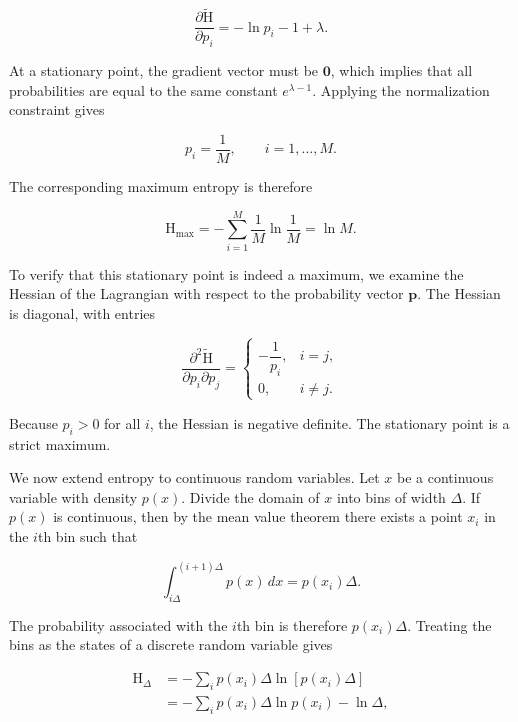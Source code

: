 \documentclass[10pt,twocolumn]{memoir}
\begin{document}
\begin{equation}
    \frac{\partial \widetilde{\mathrm{H}}}{\partial p_i} = -\ln p_i - 1 + \lambda.
\end{equation}

At a stationary point, the gradient vector must be $\mathbf{0}$, which implies that all probabilities are equal to the same constant $e^{\lambda-1}$. Applying the normalization constraint gives

\begin{equation}
    p_i = \frac{1}{M}, \qquad i=1,\ldots,M.
\end{equation}

The corresponding maximum entropy is therefore

\begin{equation}
    \mathrm{H}_{\max} = -\sum_{i=1}^{M}\frac{1}{M}\ln\frac{1}{M} = \ln M.
\end{equation}

To verify that this stationary point is indeed a maximum, we examine the Hessian of the Lagrangian with respect to the probability vector $\mathbf{p}$. The Hessian is diagonal, with entries

\begin{equation}
    \frac{\partial^2\widetilde{\mathrm{H}}}{\partial p_i\partial p_j} =
    \begin{cases}
        -\dfrac{1}{p_i}, & i=j,\\
        0, & i\neq j.
    \end{cases}
\end{equation}

Because $p_i>0$ for all $i$, the Hessian is negative definite. The stationary point is a strict maximum.

We now extend entropy to continuous random variables. Let $x$ be a continuous variable with density $p(x)$. Divide the domain of $x$ into bins of width $\Delta$. If $p(x)$ is continuous, then by the mean value theorem there exists a point $x_i$ in the $i$th bin such that

\begin{equation}
    \int_{i\Delta}^{(i+1)\Delta} p(x)\,dx = p(x_i)\Delta.
\end{equation}

The probability associated with the $i$th bin is therefore $p(x_i)\Delta$. Treating the bins as the states of a discrete random variable gives

\begin{equation}
\begin{aligned}
    \mathrm{H}_{\Delta}
    &= -\sum_i p(x_i)\Delta \ln\left[p(x_i)\Delta\right] \\
    &= -\sum_i p(x_i)\Delta\ln p(x_i) - \ln\Delta,
\end{aligned}
\end{equation}
\end{document}
